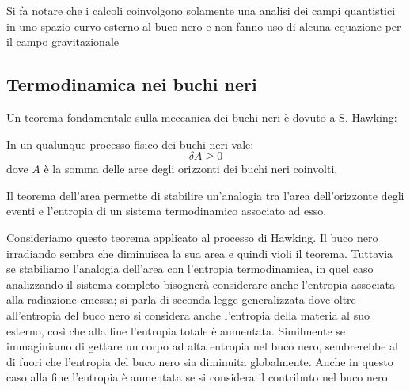Si fa notare che i calcoli coinvolgono solamente una analisi dei campi quantistici in uno spazio curvo esterno al buco nero e non fanno uso di alcuna equazione per il campo gravitazionale

\subsection{Termodinamica nei buchi neri}\label{para.termo_bh}
Un teorema fondamentale sulla meccanica dei buchi neri è dovuto a S. Hawking:
\begin{teorema}
In un qualunque processo fisico dei buchi neri vale:
\begin{equation*}
    \delta A \geq 0
\end{equation*}
dove $A$ è la somma delle aree degli orizzonti dei buchi neri coinvolti.
\end{teorema}
Il teorema dell'area permette di stabilire un'analogia tra l'area dell'orizzonte degli eventi e l'entropia di un sistema termodinamico associato ad esso.

Consideriamo questo teorema applicato al processo di Hawking. Il buco nero irradiando sembra che diminuisca la sua area e quindi violi il teorema. Tuttavia se stabiliamo l'analogia dell'area con l'entropia termodinamica, in quel caso analizzando il sistema completo bisognerà considerare anche l'entropia associata alla radiazione emessa; si parla di seconda legge generalizzata dove oltre all'entropia del buco nero si considera anche l'entropia della materia al suo esterno, così che alla fine l'entropia totale è aumentata. Similmente se immaginiamo di gettare un corpo ad alta entropia nel buco nero, sembrerebbe al di fuori che l'entropia del buco nero sia diminuita globalmente. Anche in questo caso alla fine l'entropia è aumentata se si considera il contributo nel buco nero. %

